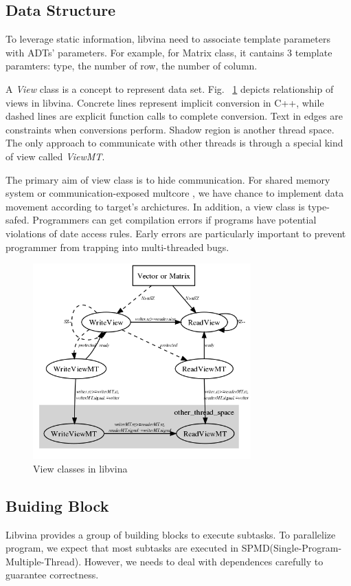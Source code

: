 \subsection{Data Structure}
To leverage static information, libvina need to
associate template parameters with ADTs' parameters. For example, for
Matrix class, it cantains 3 template paramters: type, the number of
row, the number of column.

A \emph{View} class is a concept to represent data set.
Fig. ~\ref{fig:view} depicts relationship of views in libvina. Concrete lines
represent implicit conversion in C++, while  dashed lines are explicit
function calls to complete conversion. Text in edges are constraints
when conversions perform. Shadow region is another thread space. The
only approach to communicate with other threads is through a special
kind of view called \emph{ViewMT}.  

The primary aim of view class is to hide communication. For shared
memory system or communication-exposed multcore \cite{cell, imagine}, 
we have chance to implement data movement according to target's archictures.
In addition, a view class is type-safed. Programmers can get
compilation errors if programs have potential violations of date
access rules. Early errors are particularly important to prevent programmer from trapping into multi-threaded bugs.

\begin{figure}
\includegraphics[width=3.3in]{../view_concept}
\caption{View classes in libvina}
\label{fig:view}
\end{figure}
\subsection{Buiding Block}
Libvina provides a group of building blocks to execute
subtasks. To parallelize program, we expect that most subtasks are
executed in SPMD(Single-Program-Multiple-Thread). However, we needs to
deal with dependences carefully to guarantee correctness.  

